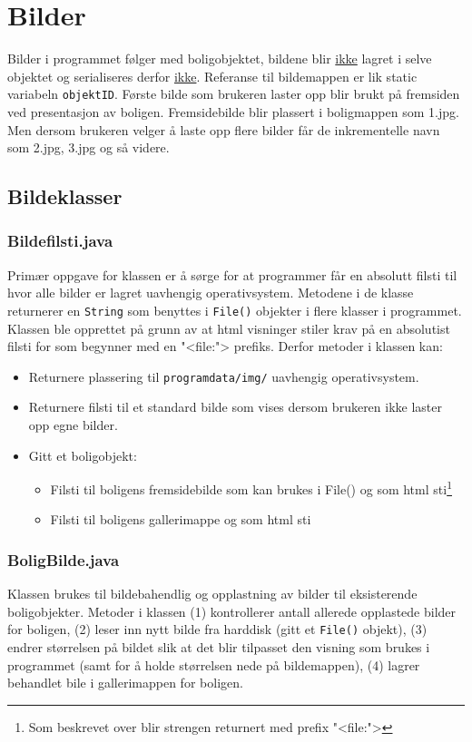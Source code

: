 \section{Bilder} \label{sec:bilder}
Bilder i programmet følger med boligobjektet, bildene blir \underline{ikke} lagret i selve objektet og serialiseres derfor \underline{ikke}. Referanse til bildemappen er lik static variabeln \texttt{objektID}. Første bilde som brukeren laster opp blir brukt på fremsiden ved presentasjon av boligen. Fremsidebilde blir plassert i boligmappen som 1.jpg. Men dersom brukeren velger å laste opp flere bilder får de inkrementelle navn som 2.jpg, 3.jpg og så videre. 

\subsection{Bildeklasser}
\subsubsection*{Bildefilsti.java}
Primær oppgave for klassen er å sørge for at programmer får en absolutt filsti til hvor alle bilder er lagret uavhengig operativsystem. Metodene i de klasse returnerer en \texttt{String} som benyttes i \texttt{File()} objekter i flere klasser i programmet.  
Klassen ble opprettet på grunn av at html visninger stiler krav på en absolutist filsti for  som begynner med en "<file:"> prefiks. 
Derfor metoder i klassen kan: 
\begin{itemize}[noitemsep,nolistsep]
\item Returnere plassering til \texttt{programdata/img/} uavhengig operativsystem.
\item Returnere filsti til et standard bilde som vises dersom brukeren ikke laster opp egne bilder.
\item Gitt et boligobjekt:
\begin{itemize}
\item Filsti til boligens fremsidebilde som kan brukes i File() og som html sti\footnote{Som beskrevet over blir strengen returnert med prefix "<file:">}
\item Filsti til boligens gallerimappe og som html sti
\end{itemize}
\end{itemize}

\subsubsection*{BoligBilde.java}
Klassen brukes til bildebahendlig og opplastning av bilder til eksisterende boligobjekter. Metoder i klassen (1) kontrollerer antall allerede opplastede bilder for boligen, (2) leser inn nytt bilde fra harddisk (gitt et \texttt{File()} objekt), (3) endrer størrelsen på bildet slik at det blir tilpasset den visning som brukes i programmet (samt for å holde størrelsen nede på bildemappen), (4) lagrer behandlet bile i gallerimappen for boligen.

